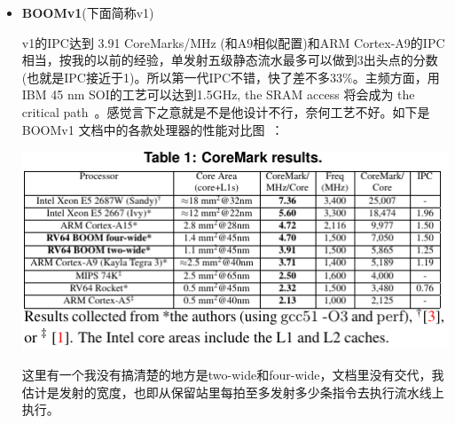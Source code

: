 \documentclass{article}
\begin{document}
	\begin{multicols}{2}
		\begin{itemize}
			\item \textbf{BOOMv1}(下面简称v1)
						
			v1的IPC达到 3.91 CoreMarks/MHz (和A9相似配置)和ARM Cortex-A9的IPC相当，按我的以前的经验，单发射五级静态流水最多可以做到3出头点的分数(也就是IPC接近于1)。所以第一代IPC不错，快了差不多33\%。主频方面，用IBM 45 nm SOI的工艺可以达到1.5GHz, the SRAM access 将会成为 the critical path~\cite{Celio:EECS-2017-157}。感觉言下之意就是不是他设计不行，奈何工艺不好。如下是BOOMv1
			文档中的各款处理器的性能对比图~\cite{Celio:EECS-2017-157}：
			
			\includegraphics[width=\linewidth]{figs/result.png}
			
			这里有一个我没有搞清楚的地方是two-wide和four-wide，文档里没有交代，我估计是发射的宽度，也即从保留站里每拍至多发射多少条指令去执行流水线上执行。
			

\end{itemize}
\end{multicols}
\end{document}

